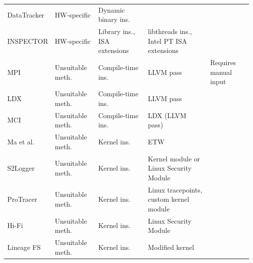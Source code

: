 \begin{table}
{\begin{tabular}{p{}p{}p{}p{}p{}}
DataTracker \cite{stamatogiannakis_looking_2015}        & HW-specific      & Dynamic binary ins.                     &                                               &                                                               \\
INSPECTOR                                               & HW-specific      & Library ins., ISA extensions            & libthreads ins., Intel PT ISA extensions      &                                                               \\
MPI\cite{ma_mpi_2017}                                   & Unsuitable meth. & Compile-time ins.                       & LLVM pass                                     & Requires manual input                                         \\
LDX \cite{kwon_ldx_2016}                                & Unsuitable meth. & Compile-time ins.                       & LLVM pass                                     &                                                               \\
MCI \cite{kwon_mci_2018}                                & Unsuitable meth. & Compile-time ins.                       & LDX (LLVM pass)                               &                                                               \\
Ma et al. \cite{ma_accurate_2015}                       & Unsuitable meth. & Kernel ins.                             & ETW                                           &                                                               \\
S2Logger \cite{suen_s2logger_2013}                      & Unsuitable meth. & Kernel ins.                             & Kernel module or Linux Security Module        &                                                               \\
ProTracer \cite{ma_protracer_2016}                      & Unsuitable meth. & Kernel ins.                             & Linux tracepoints, custom kernel module       &                                                               \\
Hi-Fi \cite{pohly_hi-fi_2012}                           & Unsuitable meth. & Kernel ins.                             & Linux Security Module                         &                                                               \\
Lineage FS \cite{sar_lineage_nodate}                    & Unsuitable meth. & Kernel ins.                             & Modified kernel                               &                                                               \\

\end{tabular}}
\end{table}
